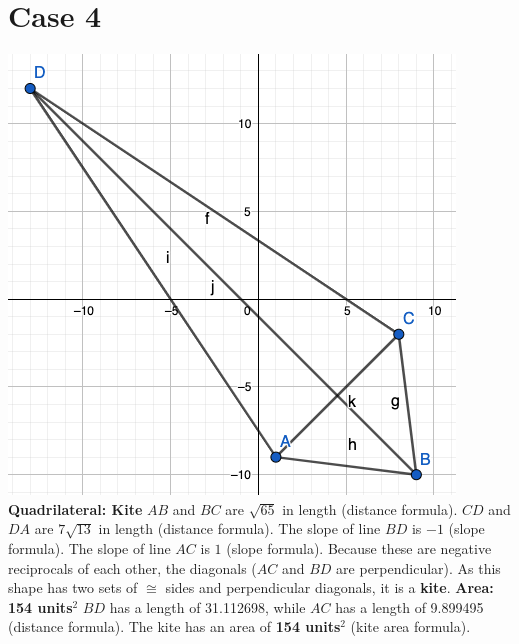\documentclass{article}
\begin{document}
	\section*{Case 4}
	\includegraphics[scale=0.38]{pics/case4} \newline
	\textbf{Quadrilateral: Kite} \newline
	$AB$ and $BC$ are $\sqrt{65}$ in length (distance formula). \newline
	$CD$ and $DA$ are $7\sqrt{13}$ in length (distance formula). \newline
	The slope of line $BD$ is $-1$ (slope formula). \newline
	The slope of line $AC$ is $1$ (slope formula). \newline
	Because these are negative reciprocals of each other, the diagonals ($AC$ and $BD$ are perpendicular). \newline
	As this shape has two sets of $\cong$ sides and perpendicular diagonals, it is a \textbf{kite}. \newline \newline
	\textbf{Area: 154 units$^2$} \newline
	$BD$ has a length of 31.112698, while $AC$ has a length of 9.899495 (distance formula). \newline
	The kite has an area of \textbf{154 units$^2$} (kite area formula).
	
\end{document}
